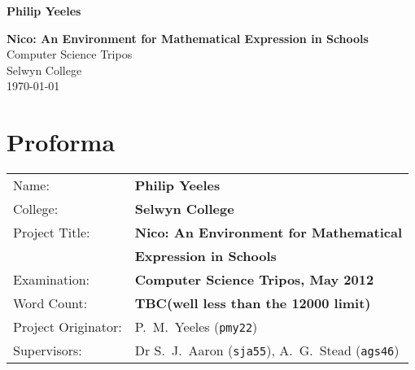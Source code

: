 \documentclass[12pt,twoside,notitlepage]{report}
\begin{document}





\pagestyle{empty}

\hfill{\LARGE \bf Philip Yeeles}

\vspace*{60mm}
\begin{center}
\Huge
{\bf Nico: An Environment for Mathematical Expression in Schools} \\
\vspace*{5mm}
Computer Science Tripos \\
\vspace*{5mm}
Selwyn College \\
\vspace*{5mm}
\today  %
\end{center}

\cleardoublepage


\setcounter{page}{1}
\pagestyle{plain}

\chapter*{Proforma}

{\large
\begin{tabular}{ll}
Name:               & \bf Philip Yeeles                                               \\
College:            & \bf Selwyn College                                              \\
Project Title:      & \bf Nico: An Environment for Mathematical\\
                    & \bf Expression in Schools \\
Examination:        & \bf Computer Science Tripos, May 2012                           \\
Word Count:         & \bf TBC\footnotemark[1]
(well less than the 12000 limit) \\
Project Originator: & P.~M.~Yeeles (\verb¬pmy22¬)                                    \\
Supervisors:        & Dr S.~J.~Aaron (\verb¬sja55¬), A.~G.~Stead (\verb¬ags46¬)     \\
\end{tabular}
}
\end{document}
